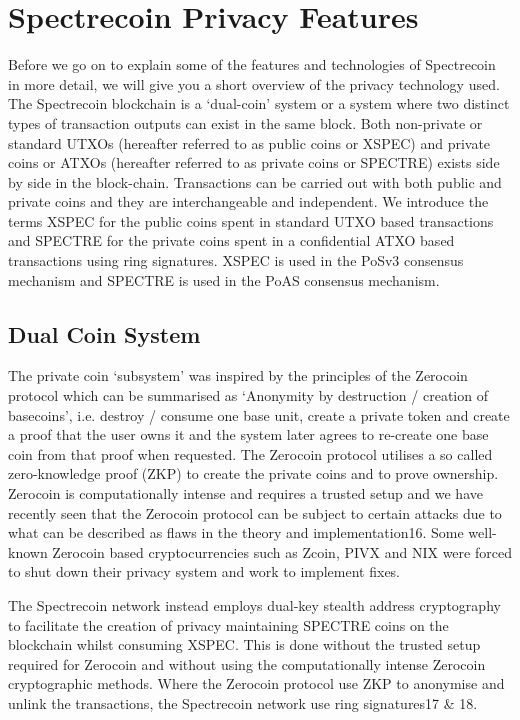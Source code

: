 \section{Spectrecoin Privacy Features}
Before we go on to explain some of the features and technologies of
Spectrecoin in more detail, we will give you a short overview of the
privacy technology used. The Spectrecoin blockchain is a ‘dual-coin’
system or a system where two distinct types of transaction outputs can
exist in the same block. Both non-private or standard UTXOs (hereafter
referred to as public coins or XSPEC) and private coins or ATXOs (hereafter
referred to as private coins or SPECTRE) exists side by side in the
block-chain. Transactions can be carried out with both public and private
coins and they are interchangeable and independent. We introduce the terms
XSPEC for the public coins spent in standard UTXO based transactions and
SPECTRE for the private coins spent in a confidential ATXO based
transactions using ring signatures. XSPEC is used in the PoSv3 consensus
mechanism and SPECTRE is used in the PoAS consensus mechanism.



\subsection{Dual Coin System}
The private coin ‘subsystem’ was inspired by the principles of the Zerocoin
protocol which can be summarised as ‘Anonymity by destruction / creation of
basecoins’, i.e. destroy / consume one base unit, create a private token
and create a proof that the user owns it and the system later agrees to
re-create one base coin from that proof when requested. The Zerocoin protocol
utilises a so called zero-knowledge proof (ZKP) to create the private coins
and to prove ownership. Zerocoin is computationally intense and requires a
trusted setup and we have recently seen that the Zerocoin protocol can be
subject to certain attacks due to what can be described as flaws in the
theory and implementation16. Some well-known Zerocoin based cryptocurrencies
such as Zcoin, PIVX and NIX were forced to shut down their privacy system and
work to implement fixes.



The Spectrecoin network instead employs dual-key stealth address cryptography
to facilitate the creation of privacy maintaining SPECTRE coins on the
blockchain whilst consuming XSPEC. This is done without the trusted setup
required for Zerocoin and without using the computationally intense Zerocoin
cryptographic methods. Where the Zerocoin protocol use ZKP to anonymise and
unlink the transactions, the Spectrecoin network use ring signatures17 \& 18.



